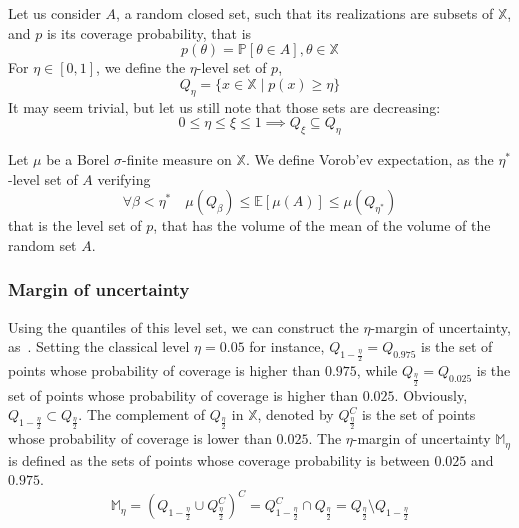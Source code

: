 \documentclass[a4paper,11pt]{article}
\newcommand{\Ex}{\mathbb{E}}
\newcommand{\Prob}{\mathbb{P}}
\newcommand{\Xspace}{\mathbb{X}}
\theoremstyle{defi}
\numberwithin{thmCounter}{section}
\begin{document}
Let us consider $A$, a random closed set, such that its realizations are subsets of $\Xspace$, and $p$ is its coverage probability, that is
\begin{equation}
  p(\theta) = \Prob\left[\theta\in A\right], \theta\in\Xspace
\end{equation}
For $\eta \in [0, 1]$, we define the $\eta$-level set of $p$,
\begin{equation}
  Q_{\eta} = \{x\in\Xspace \mid p(x) \geq \eta \}
\end{equation}
It may seem trivial, but let us still note that those sets are decreasing:
\begin{equation}
  0\leq \eta \leq \xi \leq 1 \implies Q_{\xi} \subseteq Q_{\eta}
\end{equation}

Let $\mu$ be a Borel $\sigma$-finite measure on $\Xspace$. We define Vorob'ev expectation, as the $\eta^*$-level set of $A$ verifying
\begin{equation}
  \forall \beta < \eta^* \quad \mu(Q_{\beta}) \leq \Ex[\mu(A)] \leq \mu(Q_{\eta^*})
\end{equation}
that is the level set of $p$, that has the volume of the mean of the volume of the random set $A$.

\subsubsection{Margin of uncertainty}
\label{sec:margin_of_uncertainty}
Using the quantiles of this level set, we can construct the $\eta$-margin of uncertainty, as~\cite{dubourg_reliability-based_2011}.
Setting the classical level $\eta=0.05$ for instance, $Q_{1-\frac{\eta}{2}}=Q_{0.975}$ is the set of points whose probability of coverage is higher than $0.975$, while $Q_{\frac{\eta}{2}}=Q_{0.025}$ is the set of points whose probability of coverage is higher than $0.025$. Obviously, $Q_{1-\frac{\eta}{2}} \subset Q_{\frac{\eta}{2}}$. The complement of $Q_{\frac{\eta}{2}}$ in $\Xspace$, denoted by $Q_{\frac{\eta}{2}}^C$ is the set of points whose probability of coverage is lower than $0.025$. The $\eta$-margin of uncertainty $\mathbb{M}_{\eta}$ is defined as the sets of points whose coverage probability is between $0.025$ and $0.975$.
\begin{equation*}
  \mathbb{M}_{\eta} = \left(Q_{1-\frac{\eta}{2}} \cup Q^C_{\frac{\eta}{2}} \right)^C = Q_{1-\frac{\eta}{2}}^C \cap Q_{\frac{\eta}{2}} = Q_{\frac{\eta}{2}} \setminus Q_{1-\frac{\eta}{2}}
\end{equation*}
\end{document}

